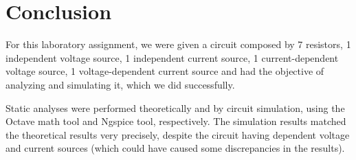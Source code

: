 
\section{Conclusion}
\label{sec:conclusion}


For this laboratory assignment, we were given a circuit composed by 7 resistors, 1 
independent voltage source, 1 independent current source, 1 current-dependent voltage
source, 1 voltage-dependent current source and had the objective of analyzing and simulating
it, which we did successfully. 

Static analyses were performed theoretically and by circuit simulation,
using the Octave math tool and Ngspice tool, respectively. The simulation results matched
the theoretical results very precisely, despite the circuit having dependent voltage and
current sources (which could have caused some discrepancies in the results).

